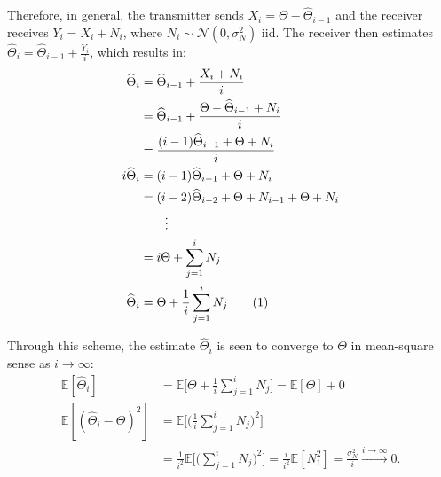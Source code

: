 \documentclass[conference]{IEEEtran}
\newcommand\numberthis{\stepcounter{equation}\tag{\theequation}}
\begin{document}
Therefore, in general, the transmitter sends $X_i = \Theta - \widehat\Theta_{i-1}$ and the receiver receives $Y_i = X_i + N_i$, where $N_i \sim \mathcal{N}(0, \sigma_N^2)$ iid. The receiver then estimates $\widehat\Theta_i = \widehat\Theta_{i-1} + \frac{Y_i}{i}$, which results in:
\begin{align*}
	\widehat{\Theta}_{i}  &= \widehat{\Theta}_{i-1}+\frac{X_{i}+N_{i}}{i} \\
					  &= \widehat{\Theta}_{i-1}+\frac{\Theta-\widehat{\Theta}_{i-1}+N_{i}}{i} \\
					  &= \frac{(i-1)\widehat{\Theta}_{i-1}+\Theta+N_{i}}{i} \\
	i\widehat{\Theta}_{i} &= (i-1)\widehat{\Theta}_{i-1}+\Theta+N_{i} \\
					  &=(i-2)\widehat{\Theta}_{i-2}+\Theta+N_{i-1}+\Theta+N_{i} \\
					  & \qquad \vdots \\
					  &= i\Theta+\sum_{j=1}^{i}N_{j} \\
	\widehat{\Theta}_{i}  &=\Theta+\frac{1}{i}\sum_{j=1}^{i}N_{j} \numberthis \label{eq:theta_hat_i-noiseless}
\end{align*}

Through this scheme, the estimate $\widehat{\Theta}_{i}$ is seen to converge to $\Theta$ in mean-square sense as $i\rightarrow\infty$:
\begin{align*}
	\mathbb{E}[\widehat{\Theta}_{i}] &= \mathbb{E}\bigg[\Theta+\frac{1}{i}\sum_{j=1}^{i}N_{j}\bigg] = \mathbb{E}[\Theta]+0 \\
	\mathbb{E}[(\widehat{\Theta}_{i}-\Theta)^{2}] &= \mathbb{E}\bigg[\bigg(\frac{1}{i}\sum_{j=1}^{i}N_{j}\bigg)^{2}\bigg] \\
												  &= \frac{1}{i^{2}}\mathbb{E}\bigg[\bigg(\sum_{j=1}^{i}N_{j}\bigg)^{2}\bigg] = \frac{i}{i^{2}}\mathbb{E}[N_{1}^{2}] = \frac{\sigma_{N}^{2}}{i}\overset{i\to\infty}\longrightarrow 0.
\end{align*}
\end{document}
